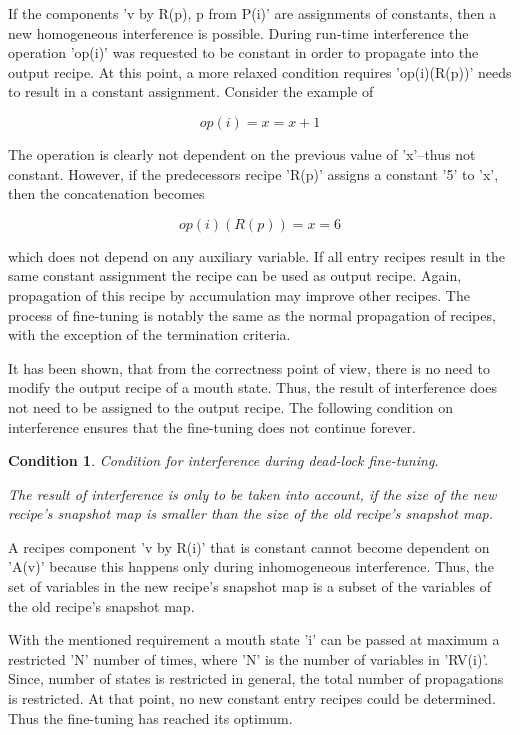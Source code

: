 \documentclass[12pt]{article}
\newtheorem{condition}{Condition}
\begin{document}
If the components 'v by R(p), p from P(i)' are assignments of constants, then a
new homogeneous interference is possible. During run-time interference the 
operation 'op(i)' was requested to be constant in order to propagate into the
output recipe. At this point, a more relaxed condition requires 'op(i)(R(p))'
needs to result in a constant assignment. Consider the example of 

\[
                       op(i) = { x = x + 1 }
\]

The operation is clearly not dependent on the previous value of 'x'--thus not
constant. However, if the predecessors recipe 'R(p)' assigns a constant '5' to
'x', then the concatenation becomes

\[
                       op(i)(R(p)) = { x = 6 }
\]

which does not depend on any auxiliary variable. If all entry recipes result in
the same constant assignment the recipe can be used as output recipe. Again,
propagation of this recipe by accumulation may improve other recipes. The process
of fine-tuning is notably the same as the normal propagation of recipes, with 
the exception of the termination criteria.

It has been shown, that from the correctness point of view, there is no need to
modify the output recipe of a mouth state. Thus, the result of interference
does not need to be assigned to the output recipe. The following condition 
on interference ensures that the fine-tuning does not continue forever.

\begin{condition}
Condition for interference during dead-lock fine-tuning.

The result of interference is only to be taken into account, if the
size of the new recipe's snapshot map is smaller than the size of 
the old recipe's snapshot map. 
\end{condition}

A recipes component 'v by R(i)' that is constant cannot become dependent on
'A(v)' because this happens only during inhomogeneous interference. Thus, the
set of variables in the new recipe's snapshot map is a subset of the variables
of the old recipe's snapshot map.

With the mentioned requirement a mouth state 'i' can be passed at maximum a
restricted 'N' number of times, where 'N' is the number of variables in
'RV(i)'. Since, number of states is restricted in general, the total number of
propagations is restricted. At that point, no new constant entry recipes could
be determined. Thus the fine-tuning has reached its optimum.
\end{document}
